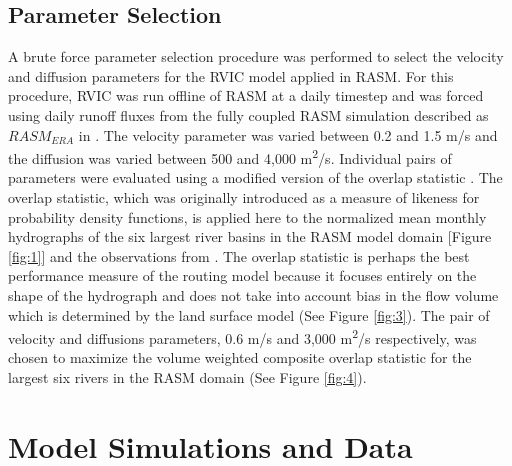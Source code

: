\documentclass[jgrga, draft]{agutex}
\begin{document}
\begin{article}
\subsection{Parameter Selection}
\label{sec:parameters}

A brute force parameter selection procedure was performed to select the velocity and diffusion parameters for the RVIC model applied in RASM.
For this procedure, RVIC was run offline of RASM at a daily timestep and was forced using daily runoff fluxes from the fully coupled RASM simulation described as $RASM_{ERA}$ in \citep{Hamman_2016}.
The velocity parameter was varied between 0.2 and 1.5 m/s and the diffusion was varied between 500 and 4,000 m\textsuperscript{2}/s.
Individual pairs of parameters were evaluated using a modified version of the overlap statistic \citet{Perkins_2012}.
The overlap statistic, which was originally introduced as a measure of likeness for probability density functions, is applied here to the normalized mean monthly hydrographs of the six largest river basins in the RASM model domain [Figure \ref{fig:1}] and the observations from \citet{Dai_2009}.
The overlap statistic is perhaps the best performance measure of the routing model because it focuses entirely on the shape of the hydrograph and does not take into account bias in the flow volume which is determined by the land surface model (See Figure \ref{fig:3}).
The pair of velocity and diffusions parameters, 0.6 m/s and 3,000 m\textsuperscript{2}/s respectively, was chosen to maximize the volume weighted composite overlap statistic for the largest six rivers in the RASM domain (See Figure \ref{fig:4}).

\section{Model Simulations and Data}


\end{article}
\end{document}
